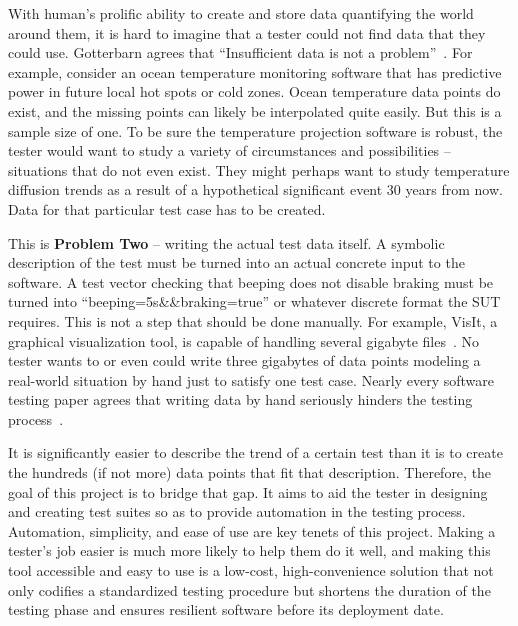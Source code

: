 With human's prolific ability to create and store data quantifying the world around them, it is hard to imagine that a tester could not find data that they could use. Gotterbarn agrees that ``Insufficient data is not a problem''~\cite{Gotterbarn:2016:CFC:2874239.2874248}. For example, consider an ocean temperature monitoring software that has predictive power in future local hot spots or cold zones. Ocean temperature data points do exist, and the missing points can likely be interpolated quite easily. But this is a sample size of one. To be sure the temperature projection software is robust, the tester would want to study a variety of circumstances and possibilities – situations that do not even exist. They might perhaps want to study temperature diffusion trends as a result of a hypothetical significant event 30 years from now. Data for that particular test case has to be created.

This is \textbf{Problem Two} -- writing the actual test data itself. A symbolic description of the test must be turned into an actual concrete input to the software. A test vector checking that beeping does not disable braking must be turned into ``beeping=5s\&\&braking=true'' or whatever discrete format the SUT requires. This is not a step that should be done manually. For example, VisIt, a graphical visualization tool, is capable of handling several gigabyte files~\cite{VisIt}. No tester wants to or even could write three gigabytes of data points modeling a real-world situation by hand just to satisfy one test case. Nearly every software testing paper agrees that writing data by hand seriously hinders the testing process~\cite{Misailovic:2007:PTG:1287624.1287645,Murphy:2007:PRT:1292414.1292425,Palka:2011:TOC:1982595.1982615,Patrick:2016:ATI:2970276.2970333}.

It is significantly easier to describe the trend of a certain test than it is to create the hundreds (if not more) data points that fit that description. Therefore, the goal of this project is to bridge that gap. It aims to aid the tester in designing and creating test suites so as to provide automation in the testing process. Automation, simplicity, and ease of use are key tenets of this project. Making a tester's job easier is much more likely to help them do it well, and making this tool accessible and easy to use is a low-cost, high-convenience solution that not only codifies a standardized testing procedure but shortens the duration of the testing phase and ensures resilient software before its deployment date. 